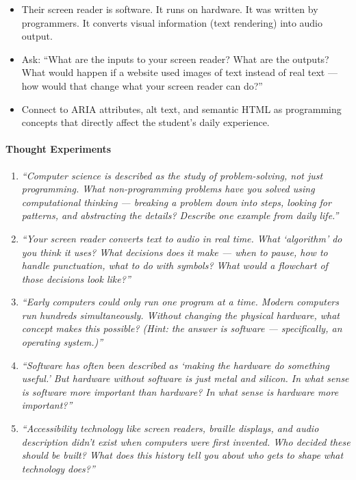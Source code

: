 \documentclass[
  justified,
  openright,
]{tufte-book}
\let\paragraph\paragraph
\let\paragraph\paragraph
\providecommand{\tightlist}{%
  \setlength{\itemsep}{0pt}\setlength{\parskip}{0pt}}
\begin{document}
\begin{itemize}
\tightlist
\item
  Their screen reader is software. It runs on hardware. It was written
  by programmers. It converts visual information (text rendering) into
  audio output.
\item
  Ask: ``What are the inputs to your screen reader? What are the
  outputs? What would happen if a website used images of text instead of
  real text --- how would that change what your screen reader can do?''
\item
  Connect to ARIA attributes, alt text, and semantic HTML as programming
  concepts that directly affect the student's daily experience.
\end{itemize}

\paragraph{Thought Experiments}\label{thought-experiments-4}

\begin{enumerate}
\def\labelenumi{\arabic{enumi}.}
\item
  \emph{``Computer science is described as the study of problem-solving,
  not just programming. What non-programming problems have you solved
  using computational thinking --- breaking a problem down into steps,
  looking for patterns, and abstracting the details? Describe one
  example from daily life.''}
\item
  \emph{``Your screen reader converts text to audio in real time. What
  `algorithm' do you think it uses? What decisions does it make --- when
  to pause, how to handle punctuation, what to do with symbols? What
  would a flowchart of those decisions look like?''}
\item
  \emph{``Early computers could only run one program at a time. Modern
  computers run hundreds simultaneously. Without changing the physical
  hardware, what concept makes this possible? (Hint: the answer is
  software --- specifically, an operating system.)''}
\item
  \emph{``Software has often been described as `making the hardware do
  something useful.' But hardware without software is just metal and
  silicon. In what sense is software more important than hardware? In
  what sense is hardware more important?''}
\item
  \emph{``Accessibility technology like screen readers, braille
  displays, and audio description didn't exist when computers were first
  invented. Who decided these should be built? What does this history
  tell you about who gets to shape what technology does?''}
\end{enumerate}
\end{document}
